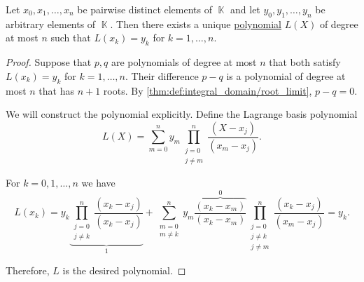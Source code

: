 \begin{theorem}\label{thm:lagrange_interpolation}
  Let \( x_0, x_1, \ldots, x_n \) be pairwise distinct elements of \( \BbbK \) and let \( y_0, y_1, \ldots, y_n \) be arbitrary elements of \( \BbbK \). Then there exists a unique \hyperref[def:polynomial_algebra/polynomials]{polynomial} \( L(X) \) of degree at most \( n \) such that \( L(x_k) = y_k \) for \( k = 1, \ldots, n \).
\end{theorem}
\begin{proof}
  \UniquenessSubProof Suppose that \( p, q \) are polynomials of degree at most \( n \) that both satisfy \( L(x_k) = y_k \) for \( k = 1, \ldots, n \). Their difference \( p - q \) is a polynomial of degree at most \( n \) that has \( n + 1 \) roots. By \cref{thm:def:integral_domain/root_limit}, \( p - q = 0 \).

  \ExistenceSubProof We will construct the polynomial explicitly. Define the Lagrange basis polynomial
  \begin{equation*}
    L(X) = \sum_{m=0}^n y_m \prod_{\substack{j = 0 \\ j \neq m}}^n \frac {(X - x_j)} {(x_m - x_j)}.
  \end{equation*}

  For \( k = 0, 1, \ldots, n \) we have
  \begin{equation*}
    L(x_k) = y_k \underbrace{\prod_{\substack{j = 0 \\ j \neq k}}^n \frac {(x_k - x_j)} {(x_k - x_j)}}_{1} + \sum_{\substack{m = 0 \\ m \neq k}}^n y_m \overbrace{\frac{(x_k - x_m)}{(x_k - x_m)}}^{0} \prod_{\substack{j = 0 \\ j \neq k \\ j \neq m}}^n \frac {(x_k - x_j)} {(x_m - x_j)} = y_k.
  \end{equation*}

  Therefore, \( L \) is the desired polynomial.
\end{proof}

